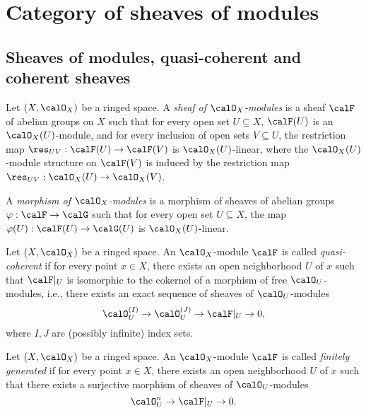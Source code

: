 \section{Category of sheaves of modules}

\subsection{Sheaves of modules, quasi-coherent and coherent sheaves}

    \begin{definition}\label{def:sheaf_of_modules}
        Let \((X,\calO_X)\) be a ringed space.
        A \emph{sheaf of \(\calO_X\)-modules} is a sheaf \(\calF\) of abelian groups on \(X\) such that for every open set \(U\subseteq X\), 
        \(\calF(U)\) is an \(\calO_X(U)\)-module, 
        and for every inclusion of open sets \(V\subseteq U\), the restriction map \(\res_{UV}:\calF(U)\to \calF(V)\) is \(\calO_X(U)\)-linear, 
        where the \(\calO_X(U)\)-module structure on \(\calF(V)\) is induced by the restriction map \(\res_{UV}:\calO_X(U)\to \calO_X(V)\).

        A \emph{morphism of \(\calO_X\)-modules} is a morphism of sheaves of abelian groups \(\varphi:\calF\to \calG\) such that 
        for every open set \(U\subseteq X\), the map \(\varphi(U):\calF(U)\to \calG(U)\) is \(\calO_X(U)\)-linear.
    \end{definition}

    \begin{definition}\label{def:quasi-coherent_sheaf}
        Let \((X,\calO_X)\) be a ringed space.
        An \(\calO_X\)-module \(\calF\) is called \emph{quasi-coherent} if for every point \(x\in X\), there exists an open neighborhood \(U\) of \(x\) such that \(\calF|_U\) is isomorphic to the cokernel of a morphism of free \(\calO_U\)-modules, i.e., there exists an exact sequence of sheaves of \(\calO_U\)-modules
        \[
            \calO_U^{(I)} \to \calO_U^{(J)} \to \calF|_U \to 0,
        \]
        where \(I,J\) are (possibly infinite) index sets.
    \end{definition}

    \begin{definition}\label{def:finitely_generated_sheaf}
        Let \((X,\calO_X)\) be a ringed space.
        An \(\calO_X\)-module \(\calF\) is called \emph{finitely generated} if for every point \(x\in X\), there exists an open neighborhood \(U\) of \(x\) such that there exists a surjective morphism of sheaves of \(\calO_U\)-modules
        \[
            \calO_U^n \to \calF|_U \to 0.
        \]
    \end{definition}

